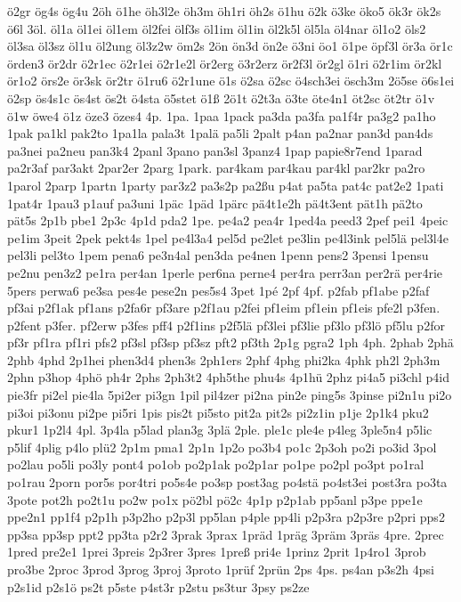 {ö2gr
ög4s
ög4u
2öh
ö1he
öh3l2e
öh3m
öh1ri
öh2s
ö1hu
ö2k
ö3ke
öko5
ök3r
ök2s
ö6l
3öl.
öl1a
öl1ei
öl1em
öl2fei
ölf3s
öl1im
öl1in
öl2k5l
öl5la
öl4nar
öl1o2
öls2
öl3sa
öl3sz
öl1u
öl2ung
öl3z2w
öm2s
2ön
ön3d
ön2e
ö3ni
öo1
ö1pe
öpf3l
ör3a
ör1c
örden3
ör2dr
ö2r1ec
ö2r1ei
ö2r1e2l
ör2erg
ö3r2erz
ör2f3l
ör2gl
ö1ri
ö2r1im
ör2kl
ör1o2
örs2e
ör3sk
ör2tr
ö1ru6
ö2r1une
ö1s
ö2sa
ö2sc
ö4sch3ei
ösch3m
2ö5se
ö6s1ei
ö2sp
ös4s1c
ös4st
ös2t
ö4sta
ö5stet
ö1ß
2ö1t
ö2t3a
ö3te
öte4n1
öt2sc
öt2tr
ö1v
ö1w
öwe4
ö1z
öze3
özes4
4p.
1pa.
1paa
1pack
pa3da
pa3fa
pa1f4r
pa3g2
pa1ho
1pak
pa1kl
pak2to
1pa1la
pala3t
1palä
pa5li
2palt
p4an
pa2nar
pan3d
pan4ds
pa3nei
pa2neu
pan3k4
2panl
3pano
pan3sl
3panz4
1pap
papie8r7end
1parad
pa2r3af
par3akt
2par2er
2parg
1park.
par4kam
par4kau
par4kl
par2kr
pa2ro
1parol
2parp
1partn
1party
par3z2
pa3s2p
pa2ßu
p4at
pa5ta
pat4c
pat2e2
1pati
1pat4r
1pau3
p1auf
pa3uni
1päc
1päd
1pärc
pä4t1e2h
pä4t3ent
pät1h
pä2to
pät5s
2p1b
pbe1
2p3c
4p1d
pda2
1pe.
pe4a2
pea4r
1ped4a
peed3
2pef
pei1
4peic
pe1im
3peit
2pek
pekt4s
1pel
pe4l3a4
pel5d
pe2let
pe3lin
pe4l3ink
pel5lä
pel3l4e
pel3li
pel3to
1pem
pena6
pe3n4al
pen3da
pe4nen
1penn
pens2
3pensi
1pensu
pe2nu
pen3z2
pe1ra
per4an
1perle
per6na
perne4
per4ra
perr3an
per2rä
per4rie
5pers
perwa6
pe3sa
pes4e
pese2n
pes5s4
3pet
1pé
2pf
4pf.
p2fab
pf1abe
p2faf
pf3ai
p2f1ak
pf1ans
p2fa6r
pf3are
p2f1au
p2fei
pf1eim
pf1ein
pf1eis
pfe2l
p3fen.
p2fent
p3fer.
pf2erw
p3fes
pff4
p2f1ins
p2f5lä
pf3lei
pf3lie
pf3lo
pf3lö
pf5lu
p2for
pf3r
pf1ra
pf1ri
pfs2
pf3sl
pf3sp
pf3sz
pft2
pf3th
2p1g
pgra2
1ph
4ph.
2phab
2phä
2phb
4phd
2p1hei
phen3d4
phen3s
2ph1ers
2phf
4phg
phi2ka
4phk
ph2l
2ph3m
2phn
p3hop
4phö
ph4r
2phs
2ph3t2
4ph5the
phu4s
4p1hü
2phz
pi4a5
pi3chl
p4id
pie3fr
pi2el
pie4la
5pi2er
pi3gn
1pil
pil4zer
pi2na
pin2e
ping5s
3pinse
pi2n1u
pi2o
pi3oi
pi3onu
pi2pe
pi5ri
1pis
pis2t
pi5sto
pit2a
pit2s
pi2z1in
p1je
2p1k4
pku2
pkur1
1p2l4
4pl.
3p4la
p5lad
plan3g
3plä
2ple.
ple1c
ple4e
p4leg
3ple5n4
p5lic
p5lif
4plig
p4lo
plü2
2p1m
pma1
2p1n
1p2o
po3b4
po1c
2p3oh
po2i
po3id
3pol
po2lau
po5li
po3ly
pont4
po1ob
po2p1ak
po2p1ar
po1pe
po2pl
po3pt
po1ral
po1rau
2porn
por5s
por4tri
po5s4e
po3sp
post3ag
po4stä
po4st3ei
post3ra
po3ta
3pote
pot2h
po2t1u
po2w
po1x
pö2bl
pö2c
4p1p
p2p1ab
pp5anl
p3pe
ppe1e
ppe2n1
pp1f4
p2p1h
p3p2ho
p2p3l
pp5lan
p4ple
pp4li
p2p3ra
p2p3re
p2pri
pps2
pp3sa
pp3sp
ppt2
pp3ta
p2r2
3prak
3prax
1präd
1präg
3präm
3präs
4pre.
2prec
1pred
pre2e1
1prei
3preis
2p3rer
3pres
1preß
pri4e
1prinz
2prit
1p4ro1
3prob
pro3be
2proc
3prod
3prog
3proj
3proto
1prüf
2prün
2ps
4ps.
ps4an
p3s2h
4psi
p2s1id
p2s1ö
ps2t
p5ste
p4st3r
p2stu
ps3tur
3psy
ps2ze
}
